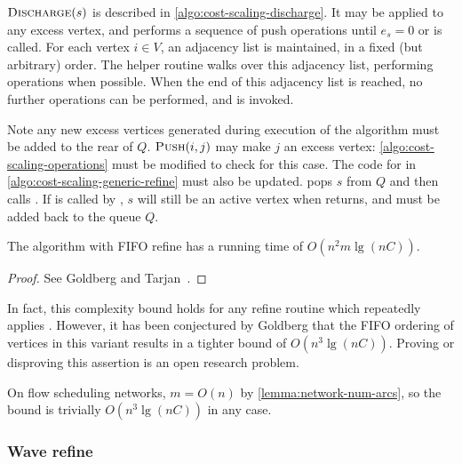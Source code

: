 $\textproc{Discharge}(s)$ is described in \cref{algo:cost-scaling-discharge}. It may be applied to any excess vertex, and performs a sequence of push operations until $e_s = 0$ or  is called. For each vertex $i \in V$, an adjacency list is maintained, in a fixed (but arbitrary) order. The helper routine  walks over this adjacency list, performing  operations when possible. When the end of this adjacency list is reached, no further  operations can be performed, and  is invoked.

Note any new excess vertices generated during execution of the algorithm must be added to the rear of $Q$. $\textproc{Push}(i,j)$ may make $j$ an excess vertex: \cref{algo:cost-scaling-operations} must be modified to check for this case. The code for  in \cref{algo:cost-scaling-generic-refine} must also be updated.  pops $s$ from $Q$ and then calls . If  is called by , $s$ will still be an active vertex when  returns, and must be added back to the queue $Q$.\\

\begin{thm} \label{thm:cost-scaling-first-active-complexity}
The algorithm with FIFO refine has a running time of $O(n^2m \lg (nC))$.
\end{thm}
\begin{proof}
See Goldberg and Tarjan~\cite[theorem~6.2]{Goldberg:1990}.
\end{proof}

\begin{remark}
In fact, this complexity bound holds for any refine routine which repeatedly applies . However, it has been conjectured by Goldberg that the FIFO ordering of vertices in this variant results in a tighter bound of $O(n^3 \lg (nC))$. Proving or disproving this assertion is an open research problem.\\
\end{remark} 

\begin{remark}
On flow scheduling networks, $m = O(n)$ by \cref{lemma:network-num-arcs}, so the bound is trivially $O(n^3 \lg (nC))$ in any case.
\end{remark}

\subsubsection{Wave refine}

